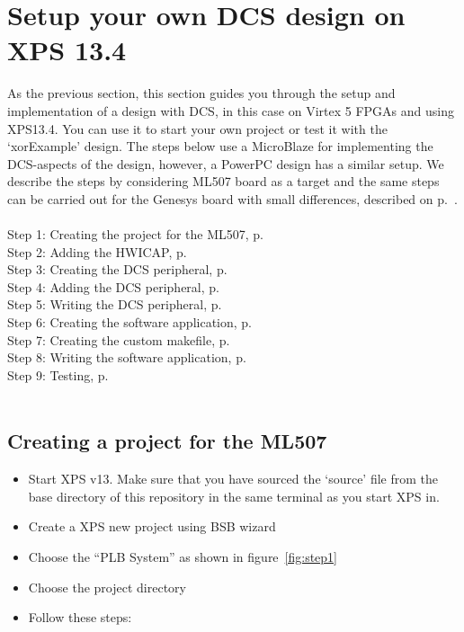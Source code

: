 \documentclass[a4paper,oneside]{memoir}
\begin{document}
\section{Setup your own DCS design on XPS 13.4}\label{sec:XPS13}
As the previous section, this section guides you through the setup and implementation of a design with DCS, in this case on Virtex 5 FPGAs and using XPS13.4. You can use it to start your own project or test it with the `xorExample' design. The steps below use a MicroBlaze for implementing the DCS-aspects of the design, however, a PowerPC design has a similar setup. We describe the steps by considering ML507 board as a target and the same steps can be carried out for the Genesys board with small differences, described on p.\ \pageref{sec:diff_genesys}.\\
\\   
Step 1: Creating the project for the ML507, p.\ \pageref{sec:creating_proj_blaze}\\
Step 2: Adding the HWICAP, p.\ \pageref{sec:adding_hwicap_blaze}\\
Step 3: Creating the DCS peripheral, p.\ \pageref{sec:creating_peripheral_blaze}\\
Step 4: Adding the DCS peripheral, p.\ \pageref{sec:adding_peripheral_blaze}\\
Step 5: Writing the DCS peripheral, p.\ \pageref{sec:writing_peripheral_blaze}\\
Step 6: Creating the software application, p.\ \pageref{sec:creating_software_blaze}\\
Step 7: Creating the custom makefile, p.\ \pageref{sec:creating_makefile_blaze}\\
Step 8: Writing the software application, p.\ \pageref{sec:writing_software_blaze}\\
Step 9: Testing, p.\ \pageref{sec:testing_blaze}\\
\\



\subsection{Creating a project for the ML507}\label{sec:creating_proj_blaze}

\begin{itemize}
\item Start XPS v13. Make sure that you have sourced the `source' file from the base directory of this repository in the same terminal as you start XPS in.
\item    Create a XPS new project using BSB wizard
\item    Choose the ``PLB System'' as shown in figure~\ref{fig:step1}
\item    Choose the project directory
\item    Follow these steps:
\end{itemize}
\end{document}
